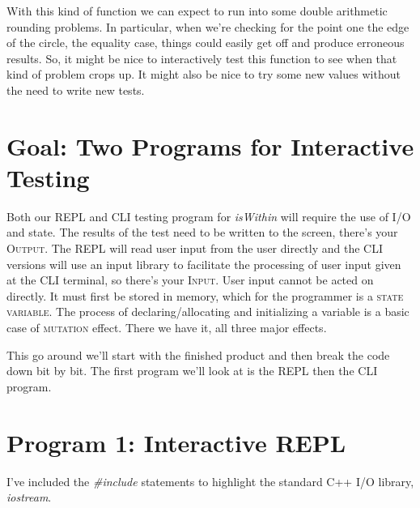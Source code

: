\documentclass[]{tufte-handout}
\begin{document}
With this kind of function we can expect to run into some double arithmetic rounding problems. In particular, when we're checking for the point one the edge of the circle, the equality case, things could easily get off and produce erroneous results. So, it might be nice to interactively test this function to see when that kind of problem crops up. It might also be nice to try some new values without the need to write new tests.


\section{Goal: Two Programs for Interactive Testing}

Both our REPL and CLI testing program for \textit{isWithin} will require the use of I/O and state. The results of the test need to be written to the screen, there's your \textsc{Output}. The REPL will read user input from the user directly and the CLI versions will use an input library to facilitate the processing of user input given at the CLI terminal, so there's your \textsc{Input}. User input cannot be acted on directly. It must first be stored in memory, which for the programmer is a \textsc{state variable}. The process of declaring/allocating and initializing a variable is a basic case of \textsc{mutation} effect. There we have it, all three major effects.

This go around we'll start with the finished product and then break the code down bit by bit. The first program we'll look at is the REPL then the CLI program.

\section{Program 1: Interactive REPL}

I've included the \textit{\#include} statements to highlight the standard C++ I/O library, \textit{iostream}.
\end{document}
